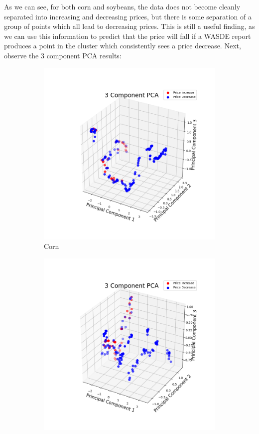 \documentclass{article}
\begin{document}
As we can see, for both corn and soybeans, the data does not become cleanly separated into increasing and decreasing prices, but there is some separation of a group of points which all lead to decreasing prices.  This is still a useful finding, as we can use this information to predict that the price will fall if a WASDE report produces a point in the cluster which consistently sees a price decrease.  Next, observe the 3 component PCA results:

\begin{figure}[h!]
\centering
\begin{subfigure}{.5\textwidth}
  \centering
  \includegraphics[scale=.4]{imagesmid/fullcorn3d}
\caption{Corn}
\end{subfigure}%
\begin{subfigure}{.5\textwidth}
  \centering
  \includegraphics[scale=.4]{imagesmid/fullsoy3d}

\end{subfigure}
\end{figure}
\end{document}
